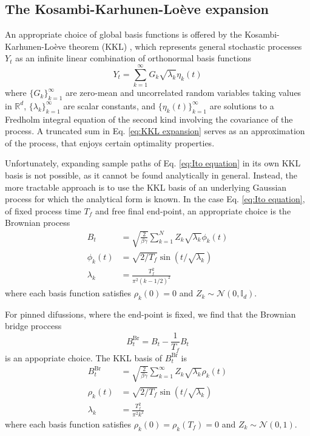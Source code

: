 \subsection{The Kosambi-Karhunen-Lo\`eve expansion}

An appropriate choice of global basis functions is offered by the Kosambi-Karhunen-Lo\`eve theorem (KKL) \citep{kosambiParallelismPathspaces, karhunenUeberLineareMethoden1947, loeveProbabilityTheory1977}, which represents general stochastic processes $Y_t$ as an infinite linear combination of orthonormal basis functions
\begin{equation} \label{eq:KKL expansion}
Y_t = \sum_{k=1}^\infty G_k \sqrt{\lambda_k} \eta_k(t)
\end{equation}
where $\{G_k\}_{k=1}^\infty$ are zero-mean and uncorrelated random variables taking values in $\mathbb{R}^d$, $\{\lambda_k\}_{k=1}^\infty$ are scalar constants, and $\{\eta_k(t)\}_{k=1}^\infty$ are solutions to a Fredholm integral equation of the second kind involving the covariance of the process. A truncated sum in Eq. \ref{eq:KKL expansion} serves as an approximation of the process, that enjoys certain optimality properties.

Unfortunately, expanding sample paths of Eq. \ref{eq:Ito equation} in its own KKL basis is not possible, as it cannot be found analytically in general. Instead, the more tractable approach is to use the KKL basis of an underlying Gaussian process for which the analytical form is known. In the case Eq. \ref{eq:Ito equation}, of fixed process time $T_f$ and free final end-point, an appropriate choice is the Brownian process
\begin{subequations}
\begin{align} 
B_t & = \sqrt{\frac{2}{\beta \gamma}} \sum_{k=1}^N Z_k \sqrt{\lambda_k} \phi_k(t) \\
\phi_k(t) & = \sqrt{2/T_f} \sin(t/ \sqrt{\lambda_k}) \\
\lambda_k & = \frac{T_f^2}{\pi^2 (k-1/2)^2}
\end{align} \label{eq:Brownian process KKL basis}
\end{subequations}
where each basis function satisfies $\rho_k(0) = 0$ and $Z_k \sim \mathcal{N}\left(0, \mathbb{I}_d \right)$.

For pinned difussions, where the end-point is fixed, we find that the Brownian bridge proccess
\begin{equation}
B^\text{Br}_t = B_t - \frac{1}{T_f} B_t
\end{equation}
is an appopriate choice. The KKL basis of $B^\text{Br}_t$ is
\begin{subequations}
\begin{align} 
B^\text{Br}_t & = \sqrt{\frac{2}{\beta \gamma}} \sum_{k=1}^\infty Z_k \sqrt{\lambda_k} \rho_k(t) \\
\rho_k(t) & = \sqrt{2/T_f} \sin(t/ \sqrt{\lambda_k}) \\
\lambda_k & = \frac{T_f^2}{\pi^2 k^2}
\end{align} \label{eq:Brownian bridge process KKL basis}
\end{subequations}
where each basis function satisfies $\rho_k(0) = \rho_k(T_f) = 0$ and $Z_k \sim \mathcal{N}\left(0, 1 \right)$.

